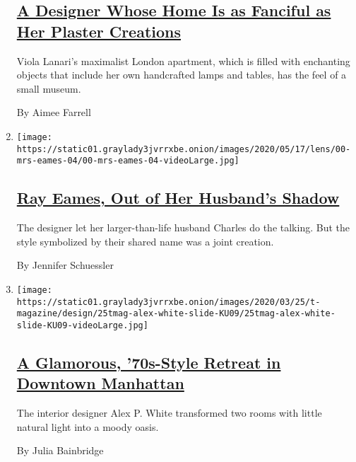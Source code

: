 \begin{enumerate}
  \hypertarget{a-designer-whose-home-is-as-fanciful-as-her-plaster-creations}{%
  \subsection{\texorpdfstring{\href{/2020/04/09/t-magazine/viola-lanari.html}{A
  Designer Whose Home Is as Fanciful as Her Plaster
  Creations}}{A Designer Whose Home Is as Fanciful as Her Plaster Creations}}\label{a-designer-whose-home-is-as-fanciful-as-her-plaster-creations}}

  Viola Lanari's maximalist London apartment, which is filled with
  enchanting objects that include her own handcrafted lamps and tables,
  has the feel of a small museum.

  By Aimee Farrell
\item
  \texttt{[image: https://static01.graylady3jvrrxbe.onion/images/2020/05/17/lens/00-mrs-eames-04/00-mrs-eames-04-videoLarge.jpg]}

  \hypertarget{ray-eames-out-of-her-husbands-shadow}{%
  \subsection{\texorpdfstring{\href{/2020/05/15/arts/ray-charles-eames-artists.html}{Ray
  Eames, Out of Her Husband's
  Shadow}}{Ray Eames, Out of Her Husband's Shadow}}\label{ray-eames-out-of-her-husbands-shadow}}

  The designer let her larger-than-life husband Charles do the talking.
  But the style symbolized by their shared name was a joint creation.

  By Jennifer Schuessler
\item
  \texttt{[image: https://static01.graylady3jvrrxbe.onion/images/2020/03/25/t-magazine/design/25tmag-alex-white-slide-KU09/25tmag-alex-white-slide-KU09-videoLarge.jpg]}

  \hypertarget{a-glamorous-70s-style-retreat-in-downtown-manhattan}{%
  \subsection{\texorpdfstring{\href{/2020/03/26/t-magazine/downtown-manhattan-apartment-alex-p-white.html}{A
  Glamorous, '70s-Style Retreat in Downtown
  Manhattan}}{A Glamorous, '70s-Style Retreat in Downtown Manhattan}}\label{a-glamorous-70s-style-retreat-in-downtown-manhattan}}

  The interior designer Alex P. White transformed two rooms with little
  natural light into a moody oasis.

  By Julia Bainbridge
\end{enumerate}


